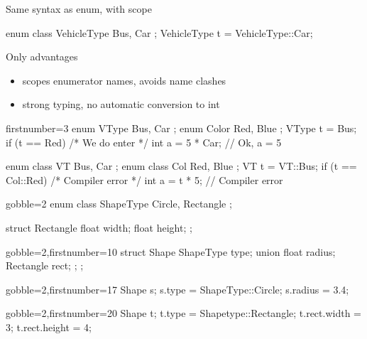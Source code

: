 \begin{frame}[fragile]
  \begin{block}{Same syntax as enum, with scope}
    \begin{cppcode*}{}
      enum class VehicleType { Bus, Car };
      VehicleType t = VehicleType::Car;
    \end{cppcode*}
  \end{block}
  \pause
  \begin{exampleblock}{Only advantages}
    \begin{itemize}
    \item scopes enumerator names, avoids name clashes
    \item strong typing, no automatic conversion to int
    \end{itemize}
    \small
    \begin{cppcode*}{firstnumber=3}
      enum VType { Bus, Car }; enum Color { Red, Blue };
      VType t = Bus;
      if (t == Red) { /* We do enter */ }
      int a = 5 * Car; // Ok, a = 5

      enum class VT { Bus, Car }; enum class Col { Red, Blue };
      VT t = VT::Bus;
      if (t == Col::Red) { /* Compiler error */ }
      int a = t * 5;       // Compiler error
    \end{cppcode*}
  \end{exampleblock}
\end{frame}

\begin{frame}[fragile]
  \begin{multicols}{2}
    \begin{cppcode*}{gobble=2}
      enum class ShapeType {
        Circle,
        Rectangle
      };

      struct Rectangle {
        float width;
        float height;
      };
    \end{cppcode*}
    \columnbreak
    \pause
    \begin{cppcode*}{gobble=2,firstnumber=10}
      struct Shape {
        ShapeType type;
        union {
          float radius;
          Rectangle rect;
        };
      };
    \end{cppcode*}
  \end{multicols}
  \pause
  \begin{multicols}{2}
    \begin{cppcode*}{gobble=2,firstnumber=17}
      Shape s;
      s.type =
        ShapeType::Circle;
      s.radius = 3.4;

    \end{cppcode*}
    \columnbreak
    \begin{cppcode*}{gobble=2,firstnumber=20}
      Shape t;
      t.type =
        Shapetype::Rectangle;
      t.rect.width = 3;
      t.rect.height = 4;
    \end{cppcode*}
  \end{multicols}
\end{frame}

